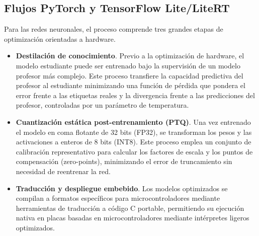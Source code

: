 \documentclass[a4paper,12pt,twoside,final]{book}
\begin{document}
\subsection{Flujos PyTorch y TensorFlow Lite/LiteRT}
Para las redes neuronales, el proceso comprende tres grandes etapas de optimización orientadas a hardware.
\begin{itemize}
  \item \textbf{Destilación de conocimiento}. Previo a la optimización de hardware, el modelo estudiante puede ser
  entrenado bajo la supervisión de un modelo profesor más complejo. Este proceso transfiere la capacidad predictiva del
  profesor al estudiante minimizando una función de pérdida que pondera el error frente a las etiquetas reales y la
  divergencia frente a las predicciones del profesor, controladas por un parámetro de temperatura.
  \item \textbf{Cuantización estática post-entrenamiento (PTQ)}. Una vez entrenado el modelo en coma flotante de 32
  bits (FP32), se transforman los pesos y las activaciones a enteros de 8 bits (INT8). Este proceso emplea un conjunto
  de calibración representativo para calcular los factores de escala y los puntos de compensación (zero-points),
  minimizando el error de truncamiento sin necesidad de reentrenar la red.
  \item \textbf{Traducción y despliegue embebido}. Los modelos optimizados se compilan a formatos específicos para
  microcontroladores mediante herramientas de traducción a código C portable, permitiendo su ejecución nativa en
  placas basadas en microcontroladores mediante intérpretes ligeros optimizados.
\end{itemize}
\end{document}

